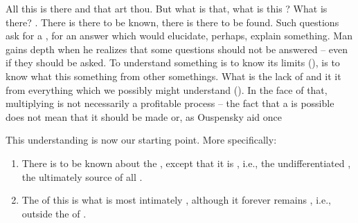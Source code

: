 \pa All this is there and that art thou.  But what is that, what is
this ?  What is there?  .  There is 
there to be known, there is  there to be found.  Such
questions ask for a , for an answer which would
elucidate, perhaps, explain something.  Man gains depth when he
realizes that some questions should not be answered -- even if they
should be asked.  To understand something is to know its limits
(), is to know what  this
something from other somethings.  What  
is the lack of  and it  it from
everything which we possibly might understand (). 
In the face of that, multiplying  is not necessarily
a profitable process -- the fact that a  is possible
does not mean that it should be made or, as Ouspensky aid once


\pa
This understanding is now our starting point. More specifically:
\begin{enumerate}
    \item There is  to be known about the , except
    that it is , i.e., the undifferentiated , the
    ultimately  source of all .  
    \item
    The  of this  is what is
    most intimately , although it forever remains 
    , i.e., outside the of .
\end{enumerate}

